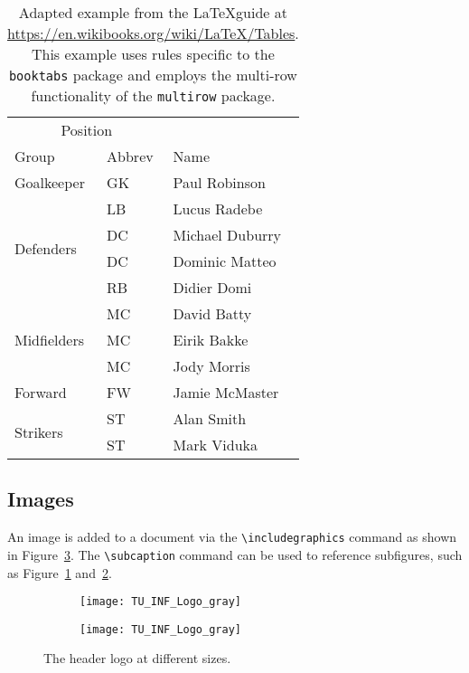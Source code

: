 \begin{table}[h] %
  \centering
  \begin{tabular}{lll}
    \toprule
    \multicolumn{2}{c}{Position} \\
    \cmidrule{1-2} %
    Group & Abbrev & Name \\
    \midrule
    Goalkeeper & GK & Paul Robinson \\
    \midrule
    \multirow{4}{*}{Defenders} & LB & Lucus Radebe \\
                               & DC & Michael Duburry \\
                               & DC & Dominic Matteo \\
                               & RB & Didier Domi \\
    \midrule
    \multirow{3}{*}{Midfielders} & MC & David Batty \\
                                 & MC & Eirik Bakke \\
                                 & MC & Jody Morris \\
    \midrule
    Forward & FW & Jamie McMaster \\
    \midrule
    \multirow{2}{*}{Strikers} & ST & Alan Smith \\
                              & ST & Mark Viduka \\
    \bottomrule
  \end{tabular}
  \caption{Adapted example from the \LaTeX guide at \url{https://en.wikibooks.org/wiki/LaTeX/Tables}. This example uses rules specific to the \texttt{booktabs} package and employs the multi-row functionality of the \texttt{multirow} package.}
  \label{tab:intro} %
\end{table}

\subsection{Images}

An image is added to a document via the \verb|\includegraphics| command as shown in Figure~\ref{fig:intro}.
The \verb|\subcaption| command can be used to reference subfigures, such as Figure~\ref{fig:intro:full width} and~\ref{fig:intro:half width}.

\begin{figure}[h]
  \centering
  \begin{subfigure}[b]{0.45\columnwidth}
    \centering
    \texttt{[image: TU\_INF\_Logo\_gray]}
    \label{fig:intro:full width}
  \end{subfigure}
  \begin{subfigure}[b]{0.45\columnwidth}
    \centering
    \texttt{[image: TU\_INF\_Logo\_gray]}
    \label{fig:intro:half width}
  \end{subfigure}
  \caption{The header logo at different sizes.}
  \label{fig:intro} %
\end{figure}

